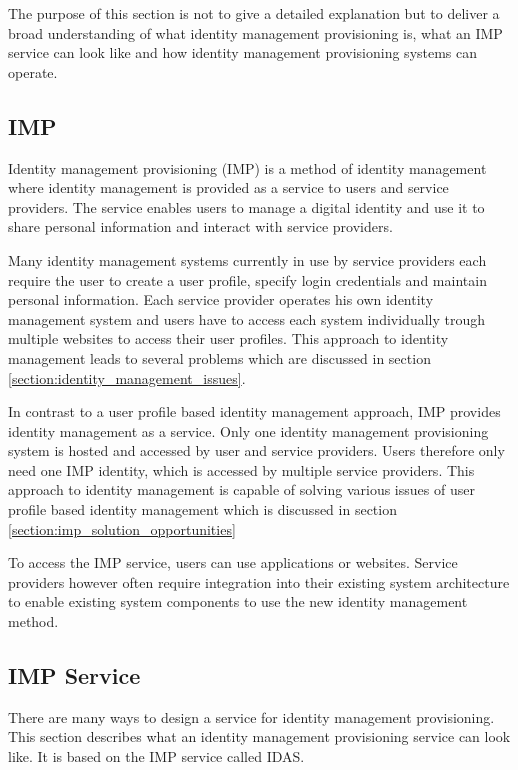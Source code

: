 The purpose of this section is not to give a detailed explanation but to deliver a broad understanding of what identity management provisioning is, what an IMP service can look like and how identity management provisioning systems can operate.

\subsection{IMP}
Identity management provisioning (IMP) is a method of identity management where identity management is provided as a service to users and service providers. The service enables users to manage a digital identity and use it to share personal information and interact with service providers.

Many identity management systems currently in use by service providers each require the user to create a user profile, specify login credentials and maintain personal information. Each service provider operates his own identity management system and users have to access each system individually trough multiple websites to access their user profiles. This approach to identity management leads to several problems which are discussed in section \ref{section:identity_management_issues}.

In contrast to a user profile based identity management approach, IMP provides identity management as a service. Only one identity management provisioning system is hosted and accessed by user and service providers. Users therefore only need one IMP identity, which is accessed by multiple service providers. This approach to identity management is capable of solving various issues of user profile based identity management which is discussed in section \ref{section:imp_solution_opportunities}

To access the IMP service, users can use applications or websites. Service providers however often require integration into their existing system architecture to enable existing system components to use the new identity management method.

\subsection{IMP Service}

There are many ways to design a service for identity management provisioning. This section describes what an identity management provisioning service can look like. It is based on the IMP service called IDAS.

